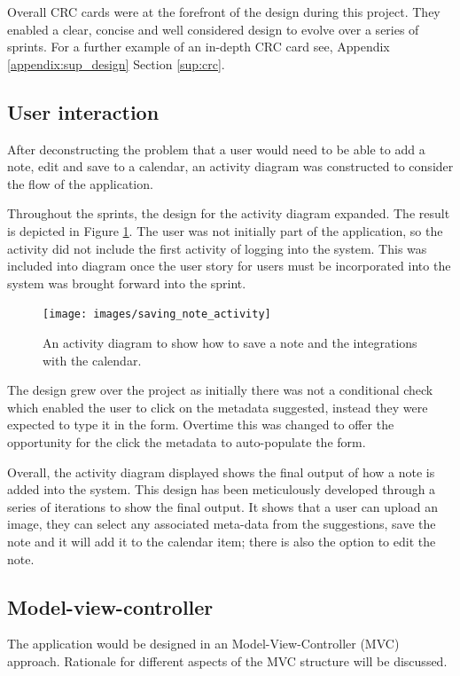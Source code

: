 Overall CRC cards were at the forefront of the design during this project. They enabled a clear, concise and well considered design to evolve over a series of sprints. For a further example of an in-depth CRC card see, Appendix \ref{appendix:sup_design} Section \ref{sup:crc}.

\subsection{User interaction} \label{design:user_interaction}
After deconstructing the problem that a user would need to be able to add a note, edit and save to a calendar, an activity diagram was constructed to consider the flow of the application.

Throughout the sprints, the design for the activity diagram expanded. The result is depicted in Figure \ref{fig:activity_show_note}. The user was not initially part of the application, so the activity did not include the first activity of logging into the system. This was included into diagram once the user story for users must be incorporated into the system was brought forward into the sprint.

\begin{figure}[H]
  \centering
  \texttt{[image: images/saving\_note\_activity]}
  \caption{An activity diagram to show how to save a note and the integrations with the calendar.}
  \label{fig:activity_show_note}
\end{figure}

The design grew over the project as initially there was not a conditional check which enabled the user to click on the metadata suggested, instead they were expected to type it in the form. Overtime this was changed to offer the opportunity for the click the metadata to auto-populate the form.

Overall, the activity diagram displayed shows the final output of how a note is added into the system. This design has been meticulously developed through a series of iterations to show the final output. It shows that a user can upload an image, they can select any associated meta-data from the suggestions, save the note and it will add it to the calendar item; there is also the option to edit the note.

\subsection{Model-view-controller}
The application would be designed in an Model-View-Controller (MVC) approach. Rationale for different aspects of the MVC structure will be discussed.

